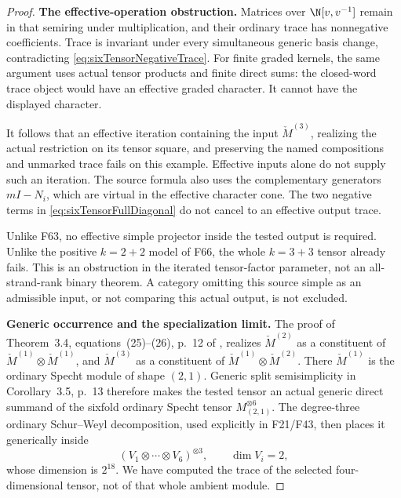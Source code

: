 \documentclass[11pt,a4paper]{article}
\newcommand{\fid}[1]{\textsf{#1}}\newcommand{\gate}[1]{\textsf{#1}}
\theoremstyle{named}\newtheorem{finding}{Finding}[section]
\theoremstyle{definition}\newtheorem{definition}[finding]{Definition}
\theoremstyle{remark}\newtheorem{remark}[finding]{Remark}
\begin{document}
\begin{proof}
\par\smallskip\noindent\textbf{The effective-operation obstruction.}\quad
Matrices over \(\N[v,v^{-1}]\) remain in that
semiring under multiplication, and their ordinary
trace has nonnegative coefficients.
Trace is invariant under every simultaneous
generic basis change, contradicting
\eqref{eq:sixTensorNegativeTrace}.
For finite graded kernels, the same argument
uses actual tensor products and finite direct
sums: the closed-word trace object would have
an effective graded character. It cannot have
the displayed character.

It follows that an effective iteration containing
the input \(\check M^{(3)}\), realizing the actual
restriction on its tensor square, and preserving
the named compositions and unmarked trace fails
on this example. Effective inputs alone do not
supply such an iteration. The source formula
also uses the complementary generators \(mI-N_i\),
which are virtual in the effective character cone.
The two negative terms in
\eqref{eq:sixTensorFullDiagonal} do not cancel
to an effective output trace.

Unlike \fid{F63}, no effective simple projector
inside the tested output is required.
Unlike the positive \(k=2+2\) model of \fid{F66},
the whole \(k=3+3\) tensor already fails.
This is an obstruction in the iterated tensor-factor
parameter, not an all-strand-rank binary theorem.
A category omitting this source simple as an
admissible input, or not comparing this actual
output, is not excluded.

\par\smallskip\noindent\textbf{Generic occurrence and the specialization limit.}\quad
The proof of Theorem~3.4, equations~(25)--(26),
p.~12 of \cite{BlasiakChebyshev}, realizes
\(\check M^{(2)}\) as a constituent of
\(\check M^{(1)}\otimes\check M^{(1)}\), and
\(\check M^{(3)}\) as a constituent of
\(\check M^{(1)}\otimes\check M^{(2)}\).
There \(\check M^{(1)}\) is the ordinary
Specht module of shape \((2,1)\).
Generic split semisimplicity in Corollary~3.5,
p.~13 therefore makes the tested tensor an
actual generic direct summand of the sixfold
ordinary Specht tensor \(M_{(2,1)}^{\otimes6}\).
The degree-three ordinary Schur--Weyl decomposition,
used explicitly in \fid{F21}/\fid{F43}, then
places it generically inside
\[
 (V_1\otimes\cdots\otimes V_6)^{\otimes3},
          \qquad \dim V_i=2,
\]
whose dimension is \(2^{18}\).
We have computed the trace of the selected
four-dimensional tensor, not of that whole
ambient module.


\end{proof}
\end{document}
